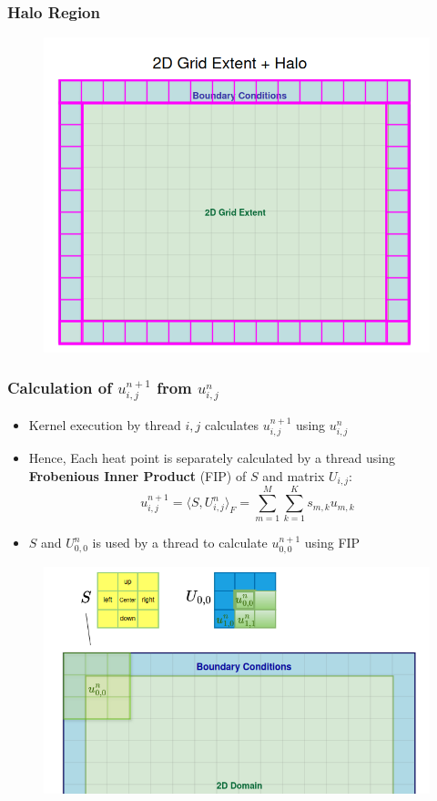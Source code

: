 \documentclass[9pt]{beamer}
\begin{document}
\begin{frame}
\frametitle{Halo Region}
\vspace{-0.5\baselineskip}
\scriptsize
    \vspace{-0.5\baselineskip}
    \begin{figure}
        \centering
        \includegraphics[width=0.6\linewidth]{Screenshot from 2024-10-22 01-51-12.png}
        \label{fig:enter-label}
    \end{figure}

\end{frame}


\begin{frame}
\frametitle{Calculation of $u_{i,j}^{n+1}$ from $u_{i,j}^{n}$}
\vspace{-0.1\baselineskip}
    \begin{itemize}
        \item Kernel execution by thread ${i,j}$  calculates $u_{i,j}^{n+1}$ using $u_{i,j}^{n}$
        \item Hence, Each heat point is separately calculated by a thread using \textbf{Frobenious Inner Product} (FIP) of \( S \) and matrix \( U_{i,j} \):
\[
 u_{i,j}^{n+1} = \langle S, U^{n}_{i,j} \rangle_F = \sum_{m=1}^{M} \sum_{k=1}^{K} s_{m,k} u_{m,k}
\]
        \item $S$ and $U^{n}_{0,0}$ is used  by a thread to calculate $u_{0,0}^{n+1}$ using FIP
    \end{itemize}
    \begin{figure}
        \centering
            \includegraphics[width=0.75\linewidth, height=0.4\textheight]{Screenshot from 2024-09-22 00-16-53.png}
        \label{fig:enter-label}
    \end{figure}
\end{frame}
\end{document}

